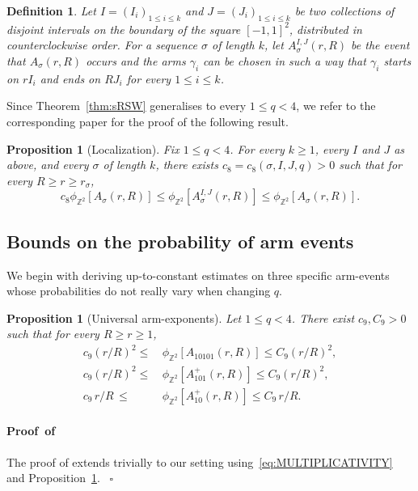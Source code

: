 \documentclass[a4paper,oneside,11pt]{article}
\newtheorem{proposition}[theorem]{Proposition}
\newtheorem{definition}[theorem]{Definition}
\numberwithin{equation}{section}
\numberwithin{equation}{section}
\numberwithin{equation}{section}
\newenvironment{proof}[1][\relax]%
  {\paragraph{Proof\ifx#1\relax\else~of #1\fi}}%
  {~\hfill$\square$\par\bigskip}
\newcommand{\bbZ}{\mathbb{Z}}
\begin{document}
\begin{definition}
Let $I=(I_i)_{1\leq i\leq k}$ and $J=(J_i)_{1\le i\le k}$ be two collections of disjoint intervals on the boundary of
the square $[-1,1]^2$, distributed in counterclockwise order. For a sequence $\sigma$ of length $k$, let $A^{I,J}_{\sigma}(r,R)$ be the event that $A_{\sigma}(r,R)$ occurs and the arms $\gamma_i$ can be chosen in such a way that $\gamma_i$ starts on $rI_i$ and ends on $RJ_i$ for every $1\leq i\leq k$.
\end{definition}

Since Theorem~\ref{thm:sRSW} generalises \cite{CheDumHon13} to every $1\le q<4$, we refer to the corresponding paper for the proof of the following result.
\begin{proposition}[Localization]\label{prop:localization}
Fix $1\le q<4$. For every $k\ge1$, every $I$ and $J$ as above, and every $\sigma$ of length $k$, there exists $c_8=c_8(\sigma,I,J,q)>0$ such that for every $R\ge r\ge r_\sigma$,
\begin{equation}
c_8\phi_{\bbZ^2}[A_{\sigma}(r,R)]\le \phi_{\bbZ^2}[A_{\sigma}^{I,J}(r,R)]\le\phi_{\bbZ^2}[A_{\sigma}(r,R)].
\end{equation}
\end{proposition}

\subsection{Bounds on the probability of arm events}\label{sec:proof_arm_events}

We begin with deriving up-to-constant estimates on three specific arm-events whose probabilities do not really vary when changing $q$.

\begin{proposition}[Universal arm-exponents]\label{prop:universal}
    Let $1\le q<4$. There exist $c_9,C_9>0$ such that for every $R\ge r\ge 1$,
    \begin{align}
    	c_9\left(r/R\right)^{2}\le\,&\phi_{\bbZ^2}[A_{10101}(r,R)]\le C_9\left(r/R\right)^{2},\label{eq:UNIVERSAL5}\\
    	c_9\left(r/R\right)^{2}\le\,&\phi_{\bbZ^2}[A_{101}^+(r,R)]\le C_9\left(r/R\right)^{2},\label{eq:UNIVERSAL3}\\
    	c_9\,r/R\,\le\,&\phi_{\bbZ^2}[A_{10}^+(r,R)]\le C_9\,r/R.\label{eq:UNIVERSAL2}  
    \end{align}
\end{proposition}

\begin{proof}The proof of \cite{CheDumHon13} extends trivially  to our setting using~\eqref{eq:MULTIPLICATIVITY} and Proposition~\ref{prop:localization}. 
\end{proof}
\end{document}
